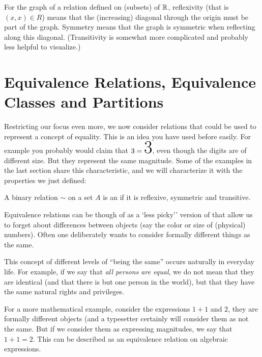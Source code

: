 For the graph of a relation defined on (subsets) of ${\mathbb R}$, reflexivity (that is $(x,x)\in
R$) means that the (increasing) diagonal through the origin must be part of the graph.
Symmetry means that the graph is symmetric when reflecting along this diagonal.
(Transitivity is somewhat more complicated and probably less helpful to visualize.)

\section{Equivalence Relations, Equivalence Classes and Partitions}
\label{secequiv}

Restricting our focus even more,
we now consider relations that could be used to represent a concept of
equality. This is an idea
you have used before easily. For example you probably would
claim that $3=\mbox{\Huge 3}$, even though the digits are of different
size. But they represent the same magnitude. Some of the examples in the
last section share this characteristic, and we will characterize it with the
properties we just defined:
\begin{defn}
A binary relation $\sim$ on a set $A$ is an  if
it is reflexive, symmetric and transitive.
\end{defn}
Equivalence relations can be though of as a `less picky'' version of
 that allow us to forget about differences between objects (say the
color or size  of (physical) numbers). Often one deliberately wants to
consider formally different things as the same. 

This concept of different levels of ``being the same'' occurs naturally in
everyday life. For example, if we say that {\em all persons are equal}, we do not
mean that they are identical (and that there is but one person in the world), but
that they have the same natural rights and privileges.

For a more mathematical example, consider the expressions $1+1$ and $2$, they are formally
different objects (and a typesetter certainly will consider them as not
the same. But if we consider them as expressing magnitudes, we say that
$1+1=2$.
This can be described as an equivalence relation on algebraic expressions.
\medskip

